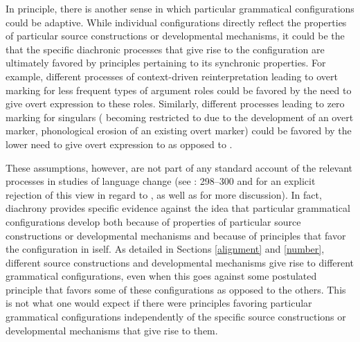 \documentclass[output=paper]{langsci/langscibook}
\begin{document}
In principle, there is another sense in which particular
grammatical configurations could be adaptive. While individual
configurations directly reflect the properties of particular
source constructions or developmental mechanisms, it could be the 
that the specific diachronic processes that give rise to the configuration are ultimately
favored by principles pertaining to its synchronic properties. For example, different
processes of context-driven reinterpretation leading to overt marking for less frequent
types of argument roles could be favored by the need to
give overt expression to these roles. Similarly, different processes leading to zero
marking for singulars (
becoming restricted to  due to the development of an overt 
marker, phonological erosion of an existing overt 
marker) could be favored by the lower need to give overt
expression to  as opposed to .

These assumptions, however, 
are not part of any standard account of the relevant processes in
studies of language change (see \citealt{BybeeEtAl1994}: 298--300 and   for an explicit rejection of this view in
regard to , as well as \citealt{Otadependencies} for
more discussion).
In fact, diachrony provides specific evidence against the
idea that particular grammatical configurations develop both
because of properties of particular source constructions or developmental
mechanisms and because of
principles that favor the configuration in iself. As detailed in Sections
\ref{alignment} and \ref{number}, different source constructions and developmental mechanisms
give rise to different grammatical configurations, even when this goes
against some postulated principle that favors some of these
configurations as opposed to the others.
This is not what one would expect if there
were principles favoring particular grammatical
configurations independently of the specific source constructions or
developmental mechanisms that give rise to them.
\end{document}

